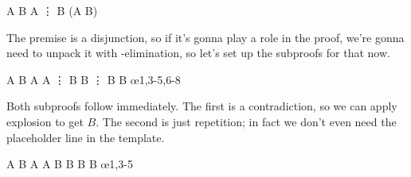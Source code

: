 \begin{fitchproof}
   {\enot A \eor B} 
  \open
   {A}              
   {\vdots}
   {B}
  \close 
   {(A \eif B)}     
\end{fitchproof}      

The premise is a disjunction, so if it's gonna play a role in the proof, we're
gonna need to unpack it with \eor-elimination, so let's set up the subproofs
for that now.

\begin{fitchproof}
   {\enot A \eor B} 
  \open
   {A}              
  \open
   {\not A}         
   {\vdots}
   {B}
  \close
  \open
   {B} 
   {\vdots}
   {B}
  \close 
   {B}              \oe{1,3-5,6-8}
  \close  
       
\end{fitchproof}      

Both subproofs follow immediately. The first is a contradiction, so we can apply
explosion to get $B$. The second is just repetition; in fact we don't even need
the placeholder line in the template.

\begin{fitchproof}
   {\enot A \eor B} 
  \open
   {A}                
  \open
   {\not A}         
   {\ebot}          
   {B}              
  \close
  \open
   {B}              
   {B}              
  \close  
   {B}              \oe{1,3-5}
  \close
        
\end{fitchproof}      

